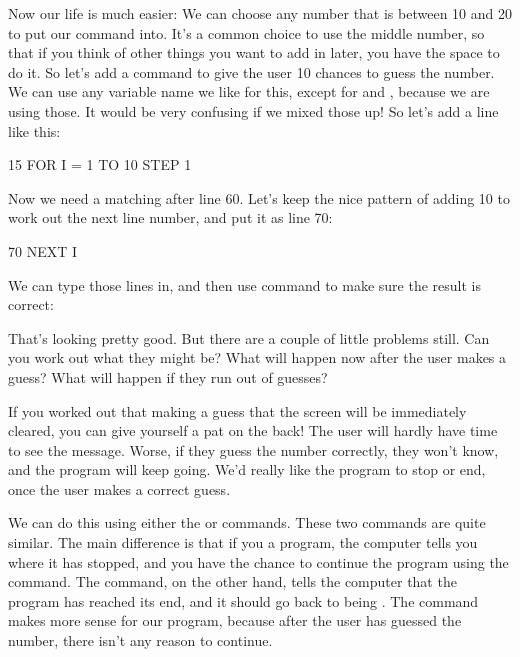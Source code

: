 
\needspace{3cm}
Now our life is much easier: We can choose any  number that is between
10 and 20 to put our  command into.  It's a common choice to
use the middle number, so that if you think of other things you want
to add in later, you have the space to do it.  So let's add a
 command to give the user 10 chances to guess the number.  We
can use any variable name we like for this, except for  and
, because we are using those. It would be very confusing if we
mixed those up!  So let's add a line like this:

\begin{screenoutput}
15 FOR I = 1 TO 10 STEP 1
\end{screenoutput}

\needspace{3cm}
Now we need a matching  after line 60.  Let's keep the
nice pattern of adding 10 to work out the next line number, and put it
as line 70:

\begin{screenoutput}
70 NEXT I
\end{screenoutput}

\needspace{4cm}
We can type those lines in, and then use  command to make
sure the result is correct:


That's looking pretty good.  But there are a couple of little problems still.
Can you work out what they might be? What will happen now after the user makes a guess?
What will happen if they run out of guesses?

If you worked out that making a guess that the screen will be
immediately cleared, you can give yourself a pat on the back! The user
will hardly have time to see the message. Worse, if they guess the
number correctly, they won't know, and the program will keep going.
We'd really like the program to stop or end, once the user makes a
correct guess.

We can do this using either the  or
 commands.  These two commands are quite similar.  The main
difference is that if you  a program, the computer tells
you where it has stopped, and you have the chance to continue the
program using the  command.  The  command, on the
other hand, tells the computer that the program has reached its end,
and it should go back to being .  The  command
makes more sense for our program, because after the user has guessed
the number, there isn't any reason to continue.

